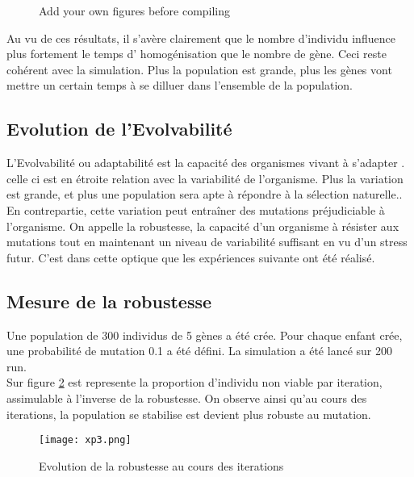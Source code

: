 \documentclass{article}
\begin{document}
	\begin{figure}[h]
	\label{xp2}
	\centering
	\null\hfill
	\hfill
	\hfill
	\hfill

	\caption{Add your own figures before compiling}
	\end{figure}

	Au vu de ces résultats, il s'avère clairement que le nombre d’individu influence plus fortement le temps d' homogénisation que le nombre de gène. Ceci reste cohérent avec la simulation. Plus la population est grande, plus les gènes vont mettre un certain temps à se dilluer dans l'ensemble de la population. 


	\subsection{Evolution de l'Evolvabilité}
	L'Evolvabilité ou adaptabilité est la capacité des organismes vivant à s'adapter . celle ci est en étroite relation avec la variabilité de l'organisme. Plus la variation est grande, et plus une population sera apte à répondre à la sélection naturelle.. En contrepartie, cette variation peut entraîner des mutations préjudiciable à l'organisme. On appelle la robustesse, la capacité d'un organisme à résister aux mutations tout en maintenant un niveau de variabilité suffisant en vu d'un stress futur. C'est dans cette optique que les expériences suivante ont été réalisé. 

	

	\subsection{Mesure de la robustesse}
	Une population de 300 individus de 5 gènes a été crée. Pour chaque enfant crée, une probabilité de mutation 0.1 a été défini. La simulation a été lancé sur 200 run. \\
	Sur figure \ref{xp3} est represente la proportion d'individu non viable par iteration, assimulable à l'inverse de la robustesse. On observe ainsi qu'au cours des iterations, la population se stabilise est devient plus robuste au mutation.

	
	\begin{figure}[h]
	\label{xp3}
	\centering
	\caption[test]{Evolution de la robustesse au cours des iterations }
	\texttt{[image: xp3.png]}
	\end{figure}
\end{document}
